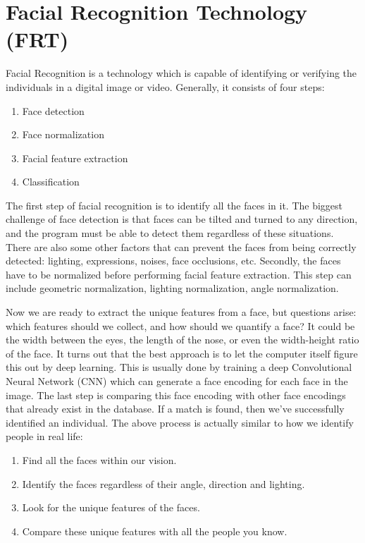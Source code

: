 \section{Facial Recognition Technology (FRT)}
Facial Recognition is a technology which is capable of identifying or verifying the individuals in a digital image or video.
Generally, it consists of four steps:

\vspace{0.5cm}
\begin{enumerate}
  \item Face detection
  \item Face normalization
  \item Facial feature extraction
  \item Classification
\end{enumerate}
\setstretch{\contentLineSpacing}

The first step of facial recognition is to identify all the faces in it. The biggest challenge of face detection
is that faces can be tilted and turned to any direction, and the program must be able to detect them regardless of
these situations. There are also some other factors that can prevent the faces from being correctly detected:
lighting, expressions, noises, face occlusions, etc. Secondly, the faces have to be normalized before performing
facial feature extraction. This step can include geometric normalization, lighting normalization, angle normalization.

Now we are ready to extract the unique features from a face, but questions arise: which features should we collect, and
how should we quantify a face? It could be the width between the eyes, the length of the nose, or even the width-height ratio
of the face. It turns out that the best approach is to let the computer itself figure this out by deep learning.
This is usually done by training a deep Convolutional Neural Network (CNN) which can generate a face encoding for each face
in the image. The last step is comparing this face encoding with other face encodings that already exist in the database.
If a match is found, then we've successfully identified an individual. The above process is actually similar to how we
identify people in real life:

\vspace{0.5cm}
\begin{enumerate}
  \item Find all the faces within our vision.
  \item Identify the faces regardless of their angle, direction and lighting.
  \item Look for the unique features of the faces.
  \item Compare these unique features with all the people you know.
\end{enumerate}
\setstretch{\contentLineSpacing}


